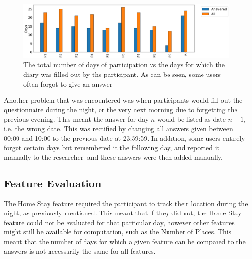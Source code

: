 \begin{figure}[h]
    \centering
    \includegraphics[width=\textwidth]{images/study/storage/answers_days_plot.png}
    \caption{The total number of days of participation vs the days for which the diary was filled out by the participant. As can be seen, some users often forgot to give an answer}
    \label{fig:plot-days-answered}
\end{figure}

Another problem that was encountered was when participants would fill out the questionnaire during the night, or the very next morning due to forgetting the previous evening. This meant the answer for day $n$ would be listed as date $n+1$, i.e. the wrong date. This was rectified by changing all answers given between 00:00 and 10:00 to the previous date at 23:59:59. In addition, some users entirely forgot certain days but remembered it the following day, and reported it manually to the researcher, and these answers were then added manually. 

\subsection{Feature Evaluation}
The Home Stay feature required the participant to track their location during the night, as previously mentioned. This meant that if they did not, the Home Stay feature could not be evaluated for that particular day, however other features might still be available for computation, such as the Number of Places. This meant that the number of days for which a given feature can be compared to the answers is not necessarily the same for all features. 

